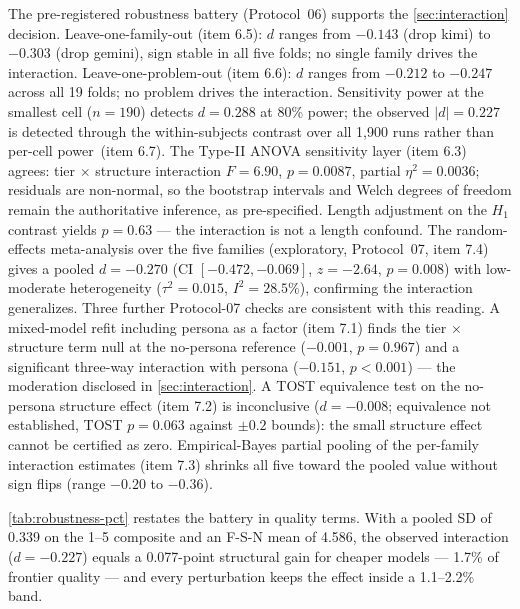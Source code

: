\documentclass[12pt,a4paper]{article}
\begin{document}
The pre-registered robustness battery (Protocol~06) supports the
\cref{sec:interaction} decision.
Leave-one-family-out (item 6.5): $d$ ranges from $-0.143$ (drop kimi) to $-0.303$ (drop
gemini), sign stable in all five folds; no single family drives the
interaction. Leave-one-problem-out (item 6.6): $d$ ranges from $-0.212$ to $-0.247$ across
all 19 folds; no problem drives the interaction. Sensitivity power at the
smallest cell ($n = 190$) detects $d = 0.288$ at 80\% power; the observed $|d|
= 0.227$ is detected through the within-subjects contrast over all 1{,}900 runs
rather than per-cell power~(item 6.7). The Type-II ANOVA sensitivity layer (item 6.3)
agrees: tier $\times$ structure interaction $F = 6.90$, $p = 0.0087$, partial
$\eta^2 = 0.0036$; residuals are non-normal, so the bootstrap intervals and
Welch degrees of freedom remain the authoritative inference, as pre-specified.
Length adjustment on the $H_1$ contrast
yields $p = 0.63$ --- the interaction is not a length confound. The
random-effects meta-analysis over the five families (exploratory, Protocol~07,
item 7.4) gives a pooled $d =
-0.270$ (CI $[-0.472, -0.069]$, $z = -2.64$, $p = 0.008$) with low-moderate
heterogeneity ($\tau^2 = 0.015$, $I^2 = 28.5\%$), confirming the interaction
generalizes. Three further Protocol-07 checks are consistent with this
reading. A mixed-model refit including persona as a factor (item 7.1) finds
the tier $\times$ structure term null at the no-persona reference
($-0.001$, $p = 0.967$) and a significant three-way interaction with persona
($-0.151$, $p < 0.001$) --- the moderation disclosed in
\cref{sec:interaction}. A TOST equivalence test on the no-persona structure
effect (item 7.2) is inconclusive ($d = -0.008$; equivalence not established,
TOST $p = 0.063$ against $\pm 0.2$ bounds): the small structure effect cannot
be certified as zero. Empirical-Bayes partial pooling of the per-family
interaction estimates (item 7.3) shrinks all five toward the pooled value
without sign flips (range $-0.20$ to $-0.36$).

\cref{tab:robustness-pct} restates the battery in quality terms. With a pooled
SD of 0.339 on the 1--5 composite and an F-S-N mean of 4.586, the observed
interaction ($d = -0.227$) equals a 0.077-point structural gain for cheaper
models --- 1.7\% of frontier quality --- and every perturbation keeps the
effect inside a 1.1--2.2\% band.
\end{document}
